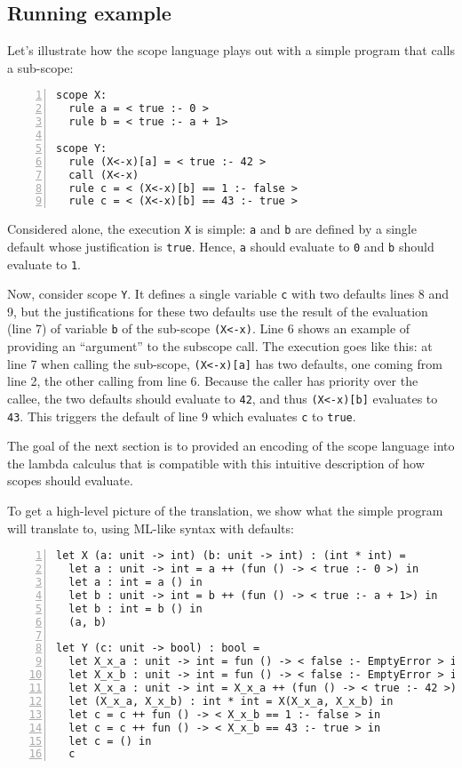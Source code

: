 \documentclass[11pt,a4paper]{article}
\begin{document}
\subsection{Running example}

Let's illustrate how the scope language plays out with a simple program 
that calls a sub-scope:
\begin{Verbatim}[frame=lines,label=Simple scope program, numbers=left, framesep=10pt]
scope X:
  rule a = < true :- 0 >
  rule b = < true :- a + 1>

scope Y:
  rule (X<-x)[a] = < true :- 42 >
  call (X<-x)
  rule c = < (X<-x)[b] == 1 :- false >
  rule c = < (X<-x)[b] == 43 :- true >
\end{Verbatim}

Considered alone, the execution \Verb+X+ is simple: \Verb+a+ and \Verb+b+ are defined by 
a single default whose justification is \Verb+true+. Hence, \Verb+a+ should evaluate 
to \Verb+0+ and \Verb+b+ should evaluate to \Verb+1+.

Now, consider scope \Verb+Y+. It defines a single variable \Verb+c+ with two defaults 
lines 8 and 9, but the justifications for these two defaults use the result of 
the evaluation (line 7) of variable \Verb+b+ of the sub-scope \Verb+(X<-x)+. 
Line 6 shows an example of providing an \enquote{argument} to the  subscope call.
The execution goes like this: at line 7 when calling the sub-scope,
\Verb+(X<-x)[a]+ has two defaults, one coming from line 2, the other calling 
from line 6. Because the caller has priority over the callee, the two defaults 
should evaluate to \Verb+42+, and thus \Verb+(X<-x)[b]+ evaluates to \Verb+43+.
This triggers the default of line 9 which evaluates \Verb+c+ to \Verb+true+. 

The goal of the next section is to provided an encoding of the scope language 
into the lambda calculus that is compatible with this intuitive description 
of how scopes should evaluate.

To get a high-level 
picture of the translation, we show what the simple program will translate 
to, using ML-like syntax with defaults:
\begin{Verbatim}[frame=lines,label=Simple default program, numbers=left, framesep=10pt]
let X (a: unit -> int) (b: unit -> int) : (int * int) =
  let a : unit -> int = a ++ (fun () -> < true :- 0 >) in
  let a : int = a () in  
  let b : unit -> int = b ++ (fun () -> < true :- a + 1>) in 
  let b : int = b () in
  (a, b)

let Y (c: unit -> bool) : bool = 
  let X_x_a : unit -> int = fun () -> < false :- EmptyError > in 
  let X_x_b : unit -> int = fun () -> < false :- EmptyError > in
  let X_x_a : unit -> int = X_x_a ++ (fun () -> < true :- 42 >) in 
  let (X_x_a, X_x_b) : int * int = X(X_x_a, X_x_b) in 
  let c = c ++ fun () -> < X_x_b == 1 :- false > in 
  let c = c ++ fun () -> < X_x_b == 43 :- true > in 
  let c = () in 
  c 
\end{Verbatim}
\end{document}
